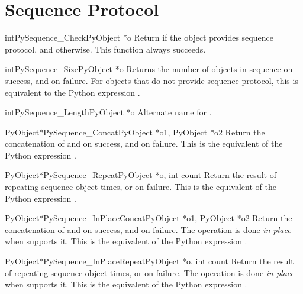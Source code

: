 \section{Sequence Protocol \label{sequence}}

\begin{cfuncdesc}{int}{PySequence_Check}{PyObject *o}
  Return  if the object provides sequence protocol, and
   otherwise.  This function always succeeds.
\end{cfuncdesc}

\begin{cfuncdesc}{int}{PySequence_Size}{PyObject *o}
  Returns the number of objects in sequence  on success, and
   on failure.  For objects that do not provide sequence
  protocol, this is equivalent to the Python expression
  .
\end{cfuncdesc}

\begin{cfuncdesc}{int}{PySequence_Length}{PyObject *o}
  Alternate name for .
\end{cfuncdesc}

\begin{cfuncdesc}{PyObject*}{PySequence_Concat}{PyObject *o1, PyObject *o2}
  Return the concatenation of  and  on success, and
  \NULL{} on failure.   This is the equivalent of the Python
  expression .
\end{cfuncdesc}


\begin{cfuncdesc}{PyObject*}{PySequence_Repeat}{PyObject *o, int count}
  Return the result of repeating sequence object  
  times, or \NULL{} on failure.  This is the equivalent of the Python
  expression .
\end{cfuncdesc}

\begin{cfuncdesc}{PyObject*}{PySequence_InPlaceConcat}{PyObject *o1,
                                                       PyObject *o2}
  Return the concatenation of  and  on success, and
  \NULL{} on failure.  The operation is done \emph{in-place} when
   supports it.  This is the equivalent of the Python
  expression .
\end{cfuncdesc}


\begin{cfuncdesc}{PyObject*}{PySequence_InPlaceRepeat}{PyObject *o, int count}
  Return the result of repeating sequence object  
  times, or \NULL{} on failure.  The operation is done \emph{in-place}
  when  supports it.  This is the equivalent of the Python
  expression .
\end{cfuncdesc}



